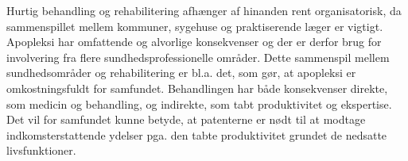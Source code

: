 Hurtig behandling og rehabilitering afhænger af hinanden rent organisatorisk, da sammenspillet mellem kommuner, sygehuse og praktiserende læger er vigtigt. Apopleksi har omfattende og alvorlige konsekvenser og der er derfor brug for involvering fra flere sundhedsprofessionelle områder.\cite{Sundhedsstyrelsen2010} Dette sammenspil mellem sundhedsområder og rehabilitering er bl.a. det, som gør, at apopleksi er omkostningsfuldt for samfundet. Behandlingen har både konsekvenser direkte, som medicin og behandling, og indirekte, som tabt produktivitet og ekspertise. Det vil for samfundet kunne betyde, at patenterne er nødt til at modtage indkomsterstattende ydelser pga. den tabte produktivitet grundet de nedsatte livsfunktioner.\cite{Sundhedsstyrelsen2010} \\
